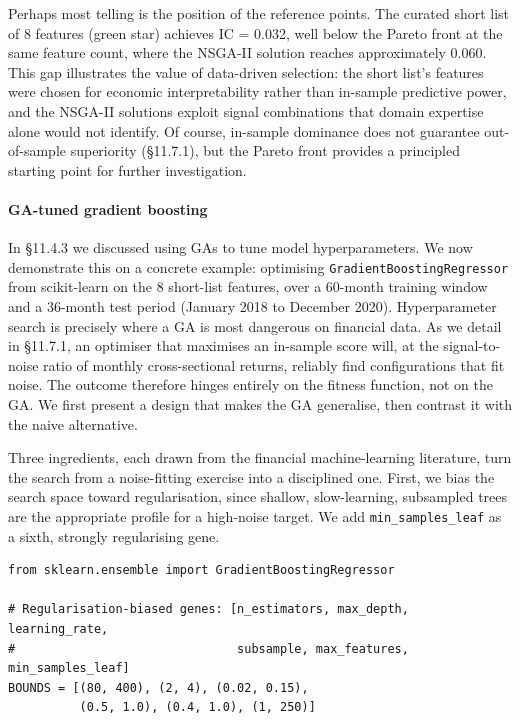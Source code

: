 Perhaps most telling is the position of the reference points. The curated short list of 8 features (green star) achieves IC = 0.032, well below the Pareto front at the same feature count, where the NSGA-II solution reaches approximately 0.060. This gap illustrates the value of data-driven selection: the short list's features were chosen for economic interpretability rather than in-sample predictive power, and the NSGA-II solutions exploit signal combinations that domain expertise alone would not identify. Of course, in-sample dominance does not guarantee out-of-sample superiority (§11.7.1), but the Pareto front provides a principled starting point for further investigation.

\paragraph{GA-tuned gradient boosting}

In §11.4.3 we discussed using GAs to tune model hyperparameters. We now demonstrate this on a concrete example: optimising \texttt{GradientBoostingRegressor} from scikit-learn on the 8 short-list features, over a 60-month training window and a 36-month test period (January 2018 to December 2020). Hyperparameter search is precisely where a GA is most dangerous on financial data. As we detail in §11.7.1, an optimiser that maximises an in-sample score will, at the signal-to-noise ratio of monthly cross-sectional returns, reliably find configurations that fit noise. The outcome therefore hinges entirely on the fitness function, not on the GA. We first present a design that makes the GA generalise, then contrast it with the naive alternative.

Three ingredients, each drawn from the financial machine-learning literature, turn the search from a noise-fitting exercise into a disciplined one. First, we bias the search space toward regularisation, since shallow, slow-learning, subsampled trees are the appropriate profile for a high-noise target. We add \texttt{min\_samples\_leaf} as a sixth, strongly regularising gene.

\begin{verbatim}
from sklearn.ensemble import GradientBoostingRegressor

# Regularisation-biased genes: [n_estimators, max_depth, learning_rate,
#                               subsample, max_features, min_samples_leaf]
BOUNDS = [(80, 400), (2, 4), (0.02, 0.15),
          (0.5, 1.0), (0.4, 1.0), (1, 250)]
\end{verbatim}

